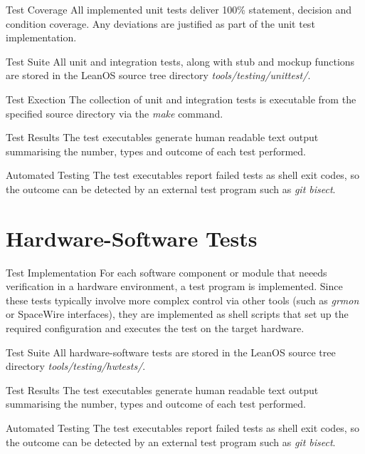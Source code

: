 {Test Coverage}{%
All implemented unit tests deliver 100\% statement, decision and condition
coverage. Any deviations are justified as part of the unit test implementation.
}%
{}{}

{Test Suite}{%
All unit and integration tests, along with stub and mockup functions are stored
in the LeanOS source tree directory \mbox{\emph{tools/testing/unittest/}}.
}%
{}{}

{Test Exection}{%
The collection of unit and integration tests is executable from the specified
source directory via the \emph{make} command.
}%
{}{}


{Test Results}{%
The test executables generate human readable text output summarising the number,
types and outcome of each test performed.
}%
{}{}


{Automated Testing}{%
The test executables report failed tests as shell exit codes, so the outcome
can be detected by an external test program such as \emph{git bisect}.
}%
{}{}




\section{Hardware-Software Tests}

{Test Implementation}{%
For each software component or module that neeeds verification in a hardware
environment, a test program is implemented.
}%
{}{Since these tests typically involve more complex control %
via other tools (such as \emph{grmon} or \gls{SpaceWire} interfaces), they are %
implemented as shell scripts that set up the required configuration and %
executes the test on the target hardware. %
}


{Test Suite}{%
All hardware-software tests are stored in the LeanOS source
tree directory \mbox{\emph{tools/testing/hwtests/}}.%
}%
{}{}


{Test Results}{%
The test executables generate human readable text output summarising the number,
types and outcome of each test performed.
}%
{}{}


{Automated Testing}{%
The test executables report failed tests as shell exit codes, so the outcome
can be detected by an external test program such as \emph{git bisect}.
}%
{}{}


